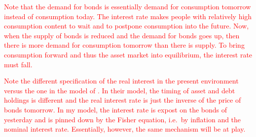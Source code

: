 \documentclass[12pt]{article} %
\numberwithin{equation}{section} %
\numberwithin{figure}{section}
\numberwithin{table}{section}
\begin{document}
\textcolor{red}{Note that the demand for bonds is essentially demand for consumption tomorrow instead of consumption today. The interest rate makes people with relatively high consumption content to wait and to postpone consumption into the future. Now, when the supply of bonds is reduced and the demand for bonds goes up, then there is more demand for consumption tomorrow than there is supply. To bring consumption forward and thus the asset market into equilibrium, the interest rate must fall.}

\textcolor{red}{Note the different specification of the real interest in the present environment versus the one in the model of \textcite{gl2017}. In their model, the timing of asset and debt holdings is different and the real interest rate is just the inverse of the price of bonds tomorrow. In my model, the interest rate is expost on the bonds of yesterday and is pinned down by the Fisher equation, i.e.~by inflation and the nominal interest rate. Essentially, however, the same mechanism will be at play.}




\end{document}
